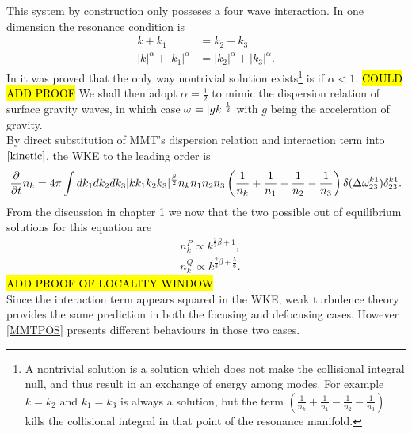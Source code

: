     This system by construction only posseses a four wave interaction. In one dimension the resonance condition is
    \begin{equation}
        \begin{aligned}
            k + k_1 &= k_2 + k_3 \\
            |k|^\alpha + |k_1|^\alpha &= |k_2|^\alpha + |k_3|^\alpha.
        \end{aligned}
    \end{equation}
    In \cite{Majda1997} it was proved that the only way nontrivial solution exists\footnote{
        A nontrivial solution is a solution which does not make the collisional integral null, and thus result in an exchange of energy among modes. 
        For example $k=k_2$ and $k_1=k_3$ is always a solution, but the term 
        $\left(\frac{1}{n_k} +\frac{1}{n_1} -\frac{1}{n_2}-\frac{1}{n_3} \right)$ kills the collisional integral in that point of the resonance manifold.
    } is if $\alpha < 1$. \hl{COULD ADD PROOF} We shall then adopt $\alpha = \frac{1}{2}$ to mimic the dispersion relation of surface gravity waves, in which case $\omega^{} = |gk|^\frac{1}{2}$ 
    with $g$ being the acceleration of gravity.\\
    By direct substitution of MMT's dispersion relation and interaction term into $\eqref{kinetic}$, the WKE to the leading order is 
    \begin{equation}
        \frac{\partial}{\partial t} n_k = 4 \pi\int dk_1 dk_2 dk_3 \\
        |kk_1k_2k_3|^\frac{\beta}{2}n_kn_1n_2n_3
    \left(\frac{1}{n_k} + \frac{1}{n_1} - \frac{1}{n_2}- \frac{1}{n_3}  \right)
    \delta(\Delta{\omega}^{k1}_{23})\delta^{k1}_{23}.
    \end{equation}
    From the discussion in chapter 1 we now that the two possible out of equilibrium solutions for this equation are 
    \begin{equation}
        \begin{aligned}
        &n_k^P \propto k^{\frac{2}{3}\beta + 1}, \\
        &n_k^Q \propto k^{\frac{2}{3}\beta + \frac{5}{6}}.
        \end{aligned}
        \label{MMTKZ}
    \end{equation}
    \hl{ADD PROOF OF LOCALITY WINDOW}\\
    Since the interaction term appears squared in the WKE, weak turbulence theory provides the same prediction in both the focusing and defocusing cases. 
    However \eqref{MMTPOS} presents different behaviours in those two cases. 

